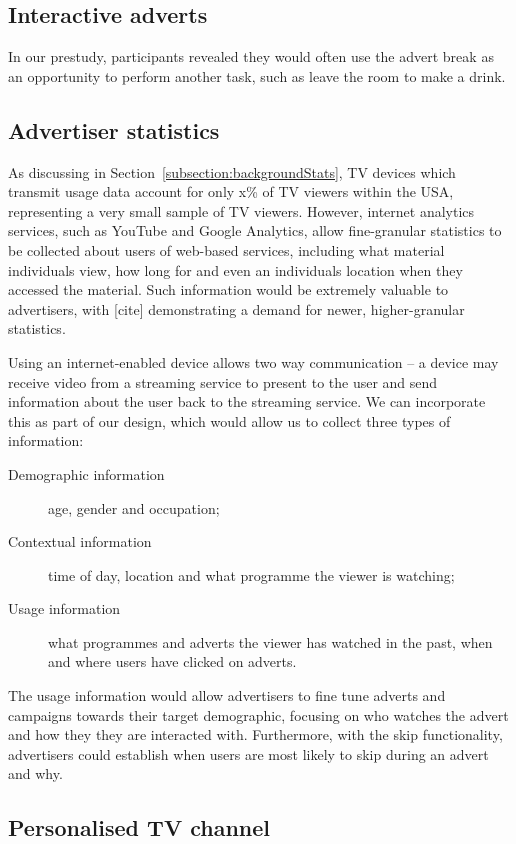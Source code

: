 \subsection{Interactive adverts}

	In our prestudy, participants revealed they would often use the advert break as an opportunity to perform another task, such as leave the room to make a drink.

\subsection{Advertiser statistics}

	As discussing in Section~\ref{subsection:backgroundStats}, TV devices which transmit usage data account for only x\% of TV viewers within the USA, representing a very small sample of TV viewers. However, internet analytics services, such as YouTube and Google Analytics, allow fine-granular statistics to be collected about users of web-based services, including what material individuals view, how long for and even an individuals location when they accessed the material. Such information would be extremely valuable to advertisers, with [cite] demonstrating a demand for newer, higher-granular statistics.

	Using an internet-enabled device allows two way communication -- a device may receive video from a streaming service to present to the user and send information about the user back to the streaming service. We can incorporate this as part of our design, which would allow us to collect three types of information:
	\begin{description}
	\item[Demographic information] age, gender and occupation;
	\item[Contextual information] time of day, location and what programme the viewer is watching;
	\item[Usage information] what programmes and adverts the viewer has watched in the past, when and where users have clicked on adverts.
	\end{description}

	The usage information would allow advertisers to fine tune adverts and campaigns towards their target demographic, focusing on who watches the advert and how they they are interacted with. Furthermore, with the skip functionality, advertisers could establish when users are most likely to skip during an advert and why.

\subsection{Personalised TV channel}

